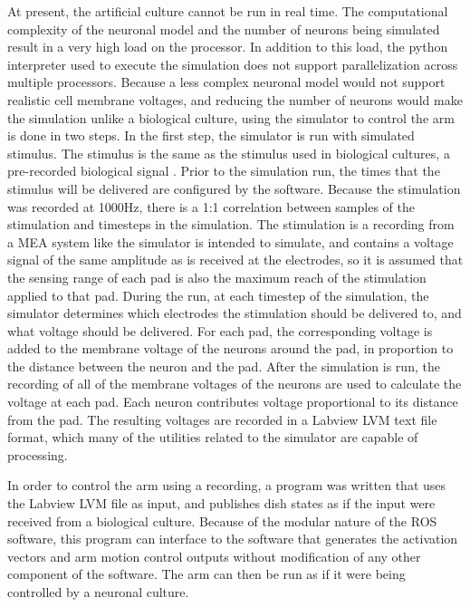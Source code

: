 \documentclass[letterpaper]{article}
\begin{document}
At present, the artificial culture cannot be run in real time. 
The computational complexity of the neuronal model and the number of neurons being simulated result in a very high load on the processor. 
In addition to this load, the python interpreter used to execute the simulation does not support parallelization across multiple processors. 
Because a less complex neuronal model would not support realistic cell membrane voltages, and reducing the number of neurons would make the simulation unlike a biological culture, using the simulator to control the arm is done in two steps. 
In the first step, the simulator is run with simulated stimulus. 
The stimulus is the same as the stimulus used in biological cultures, a pre-recorded biological signal \cite{zemianek2012stimulation}. 
Prior to the simulation run, the times that the stimulus will be delivered are configured by the software. 
Because the stimulation was recorded at 1000Hz, there is a 1:1 correlation between samples of the stimulation and timesteps in the simulation. 
The stimulation is a recording from a MEA system like the simulator is intended to simulate, and contains a voltage signal of the same amplitude as is received at the electrodes, so it is assumed that the sensing range of each pad is also the maximum reach of the stimulation applied to that pad. 
During the run, at each timestep of the simulation, the simulator determines which electrodes the stimulation should be delivered to, and what voltage should be delivered.
For each pad, the corresponding voltage is added to the membrane voltage of the neurons around the pad, in proportion to the distance between the neuron and the pad. 
After the simulation is run, the recording of all of the membrane voltages of the neurons are used to calculate the voltage at each pad. 
Each neuron contributes voltage proportional to its distance from the pad. 
The resulting voltages are recorded in a Labview LVM text file format, which many of the utilities related to the simulator are capable of processing. 

In order to control the arm using a recording, a program was written that uses the Labview LVM file as input, and publishes dish states as if the input were received from a biological culture.
Because of the modular nature of the ROS software, this program can interface to the software that generates the activation vectors and arm motion control outputs without modification of any other component of the software. 
The arm can then be run as if it were being controlled by a neuronal culture. 
\end{document}
